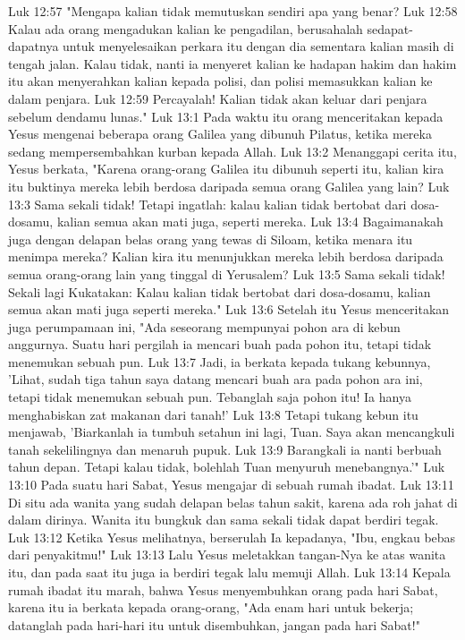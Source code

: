 Luk 12:57  "Mengapa kalian tidak memutuskan sendiri apa yang benar?
Luk 12:58  Kalau ada orang mengadukan kalian ke pengadilan, berusahalah sedapat-dapatnya untuk menyelesaikan perkara itu dengan dia sementara kalian masih di tengah jalan. Kalau tidak, nanti ia menyeret kalian ke hadapan hakim dan hakim itu akan menyerahkan kalian kepada polisi, dan polisi memasukkan kalian ke dalam penjara.
Luk 12:59  Percayalah! Kalian tidak akan keluar dari penjara sebelum dendamu lunas."
Luk 13:1  Pada waktu itu orang menceritakan kepada Yesus mengenai beberapa orang Galilea yang dibunuh Pilatus, ketika mereka sedang mempersembahkan kurban kepada Allah.
Luk 13:2  Menanggapi cerita itu, Yesus berkata, "Karena orang-orang Galilea itu dibunuh seperti itu, kalian kira itu buktinya mereka lebih berdosa daripada semua orang Galilea yang lain?
Luk 13:3  Sama sekali tidak! Tetapi ingatlah: kalau kalian tidak bertobat dari dosa-dosamu, kalian semua akan mati juga, seperti mereka.
Luk 13:4  Bagaimanakah juga dengan delapan belas orang yang tewas di Siloam, ketika menara itu menimpa mereka? Kalian kira itu menunjukkan mereka lebih berdosa daripada semua orang-orang lain yang tinggal di Yerusalem?
Luk 13:5  Sama sekali tidak! Sekali lagi Kukatakan: Kalau kalian tidak bertobat dari dosa-dosamu, kalian semua akan mati juga seperti mereka."
Luk 13:6  Setelah itu Yesus menceritakan juga perumpamaan ini, "Ada seseorang mempunyai pohon ara di kebun anggurnya. Suatu hari pergilah ia mencari buah pada pohon itu, tetapi tidak menemukan sebuah pun.
Luk 13:7  Jadi, ia berkata kepada tukang kebunnya, 'Lihat, sudah tiga tahun saya datang mencari buah ara pada pohon ara ini, tetapi tidak menemukan sebuah pun. Tebanglah saja pohon itu! Ia hanya menghabiskan zat makanan dari tanah!'
Luk 13:8  Tetapi tukang kebun itu menjawab, 'Biarkanlah ia tumbuh setahun ini lagi, Tuan. Saya akan mencangkuli tanah sekelilingnya dan menaruh pupuk.
Luk 13:9  Barangkali ia nanti berbuah tahun depan. Tetapi kalau tidak, bolehlah Tuan menyuruh menebangnya.'"
Luk 13:10  Pada suatu hari Sabat, Yesus mengajar di sebuah rumah ibadat.
Luk 13:11  Di situ ada wanita yang sudah delapan belas tahun sakit, karena ada roh jahat di dalam dirinya. Wanita itu bungkuk dan sama sekali tidak dapat berdiri tegak.
Luk 13:12  Ketika Yesus melihatnya, berserulah Ia kepadanya, "Ibu, engkau bebas dari penyakitmu!"
Luk 13:13  Lalu Yesus meletakkan tangan-Nya ke atas wanita itu, dan pada saat itu juga ia berdiri tegak lalu memuji Allah.
Luk 13:14  Kepala rumah ibadat itu marah, bahwa Yesus menyembuhkan orang pada hari Sabat, karena itu ia berkata kepada orang-orang, "Ada enam hari untuk bekerja; datanglah pada hari-hari itu untuk disembuhkan, jangan pada hari Sabat!"
